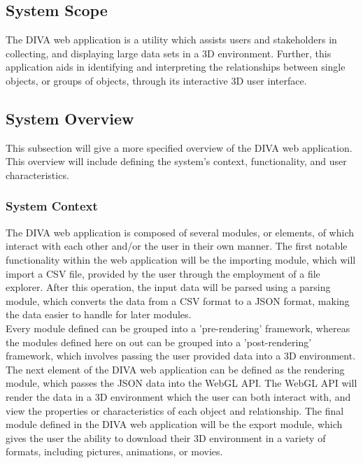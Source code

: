\documentclass[journal,10pt,onecolumn,compsoc]{IEEEtran} \usepackage[margin=1.0in]{geometry} \usepackage{pdfpages}
\begin{document}
    \subsection{System Scope}
    \noindent The DIVA web application is a utility which assists users and stakeholders in collecting, and displaying large data sets in a 3D environment. Further, this application aids in identifying and interpreting the relationships between single objects, or groups of objects, through its interactive 3D user interface. 

    \subsection{System Overview}
    \noindent This subsection will give a more specified overview of the DIVA web application. This overview will include defining the system's context, functionality, and user characteristics. 
        \subsubsection{System Context}
        The DIVA web application is composed of several modules, or elements, of which interact with each other and/or the user in their own manner. The first notable functionality within the web application will be the importing module, which will import a CSV file, provided by the user through the employment of a file explorer. After this operation, the input data will be parsed using a parsing module, which converts the data from a CSV format to a JSON format, making the data easier to handle for later modules. \\
        \newline Every module defined can be grouped into a 'pre-rendering' framework, whereas the modules defined here on out can be grouped into a 'post-rendering' framework, which involves passing the user provided data into a 3D environment. The next element of the DIVA web application can be defined as the rendering module, which passes the JSON data into the WebGL API. The WebGL API will render the data in a 3D environment which the user can both interact with, and view the properties or characteristics of each object and relationship. The final module defined in the DIVA web application will be the export module, which gives the user the ability to download their 3D environment in a variety of formats, including pictures, animations, or movies. 
\end{document}
